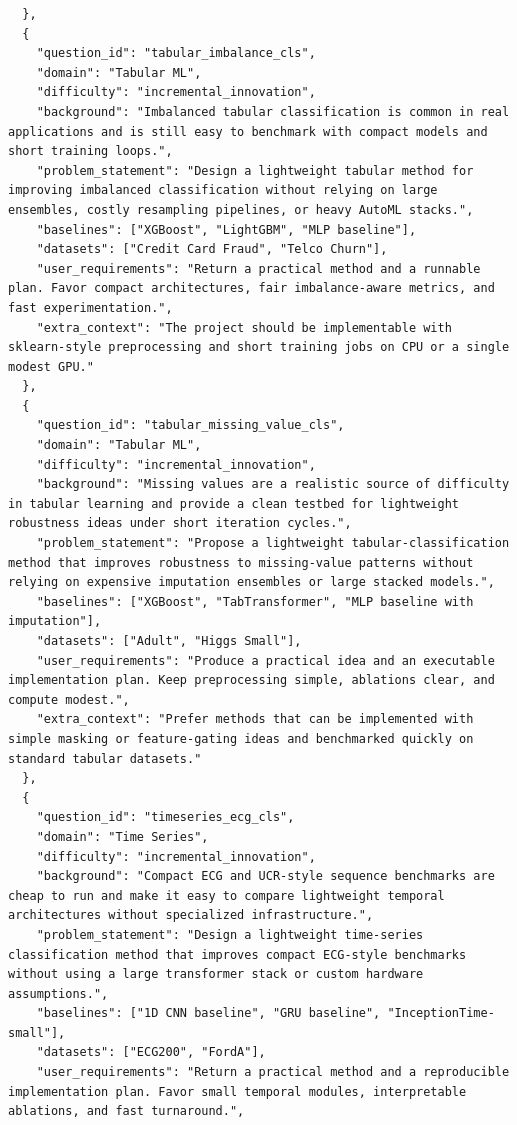 \documentclass{opendatalab}
\begin{document}
\begin{lstlisting}
  },
  {
    "question_id": "tabular_imbalance_cls",
    "domain": "Tabular ML",
    "difficulty": "incremental_innovation",
    "background": "Imbalanced tabular classification is common in real applications and is still easy to benchmark with compact models and short training loops.",
    "problem_statement": "Design a lightweight tabular method for improving imbalanced classification without relying on large ensembles, costly resampling pipelines, or heavy AutoML stacks.",
    "baselines": ["XGBoost", "LightGBM", "MLP baseline"],
    "datasets": ["Credit Card Fraud", "Telco Churn"],
    "user_requirements": "Return a practical method and a runnable plan. Favor compact architectures, fair imbalance-aware metrics, and fast experimentation.",
    "extra_context": "The project should be implementable with sklearn-style preprocessing and short training jobs on CPU or a single modest GPU."
  },
  {
    "question_id": "tabular_missing_value_cls",
    "domain": "Tabular ML",
    "difficulty": "incremental_innovation",
    "background": "Missing values are a realistic source of difficulty in tabular learning and provide a clean testbed for lightweight robustness ideas under short iteration cycles.",
    "problem_statement": "Propose a lightweight tabular-classification method that improves robustness to missing-value patterns without relying on expensive imputation ensembles or large stacked models.",
    "baselines": ["XGBoost", "TabTransformer", "MLP baseline with imputation"],
    "datasets": ["Adult", "Higgs Small"],
    "user_requirements": "Produce a practical idea and an executable implementation plan. Keep preprocessing simple, ablations clear, and compute modest.",
    "extra_context": "Prefer methods that can be implemented with simple masking or feature-gating ideas and benchmarked quickly on standard tabular datasets."
  },
  {
    "question_id": "timeseries_ecg_cls",
    "domain": "Time Series",
    "difficulty": "incremental_innovation",
    "background": "Compact ECG and UCR-style sequence benchmarks are cheap to run and make it easy to compare lightweight temporal architectures without specialized infrastructure.",
    "problem_statement": "Design a lightweight time-series classification method that improves compact ECG-style benchmarks without using a large transformer stack or custom hardware assumptions.",
    "baselines": ["1D CNN baseline", "GRU baseline", "InceptionTime-small"],
    "datasets": ["ECG200", "FordA"],
    "user_requirements": "Return a practical method and a reproducible implementation plan. Favor small temporal modules, interpretable ablations, and fast turnaround.",

\end{lstlisting}
\end{document}
